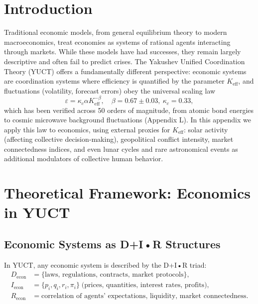 \documentclass[11pt,a4paper]{article}
\newcommand{\Keff}{K_{\mathrm{eff}}}
\theoremstyle{remark}
\begin{document}
	\tableofcontents
	\newpage
	
	\section{Introduction}
	\label{sec:intro}
	
	Traditional economic models, from general equilibrium theory to modern macroeconomics, treat economies as systems of rational agents interacting through markets. While these models have had successes, they remain largely descriptive and often fail to predict crises. The Yakushev Unified Coordination Theory (YUCT) offers a fundamentally different perspective: economic systems are coordination systems where efficiency is quantified by the parameter $\Keff$, and fluctuations (volatility, forecast errors) obey the universal scaling law
	\begin{equation}
		\varepsilon = \kappa_c \alpha \Keff^{-\beta}, \quad \beta = 0.67 \pm 0.03, \ \kappa_c = 0.33,
		\label{eq:universal}
	\end{equation}
	which has been verified across 50 orders of magnitude, from atomic bond energies to cosmic microwave background fluctuations (Appendix L). In this appendix we apply this law to economics, using external proxies for $\Keff$: solar activity (affecting collective decision‑making), geopolitical conflict intensity, market connectedness indices, and even lunar cycles and rare astronomical events as additional modulators of collective human behavior.
	
	\section{Theoretical Framework: Economics in YUCT}
	\label{sec:theory}
	
	\subsection{Economic Systems as D+I•R Structures}
	
	In YUCT, any economic system is described by the D+I•R triad:
	\begin{align*}
		D_{\text{econ}} &= \{\text{laws, regulations, contracts, market protocols}\}, \\
		I_{\text{econ}} &= \{p_i, q_i, r_i, \pi_i\} \; \text{(prices, quantities, interest rates, profits)},\\
		R_{\text{econ}} &= \text{correlation of agents' expectations, liquidity, market connectedness}.
	\end{align*}
	
\end{document}
